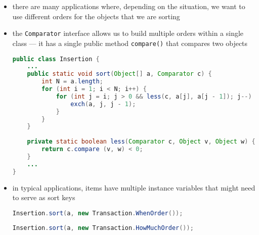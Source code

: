 \documentclass[8pt,a4paper,compress]{beamer}
\begin{document}
\begin{frame}[fragile]
\begin{itemize}
\item there are many applications where, depending on the situation, we want to use different orders for the objects that we are sorting

\item the \lstinline$Comparator$ interface allows us to build multiple orders within a single class --- it has
a single public method \lstinline$compare()$ that compares two objects
\begin{lstlisting}[language=Java]
public class Insertion {
    ...
    public static void sort(Object[] a, Comparator c) {
        int N = a.length;
        for (int i = 1; i < N; i++) {
            for (int j = i; j > 0 && less(c, a[j], a[j - 1]); j--) {
                exch(a, j, j - 1);
            }
        }
    }
    
    private static boolean less(Comparator c, Object v, Object w) {     
        return c.compare (v, w) < 0; 
    }
    ...
}
\end{lstlisting}

\item in typical applications, items have multiple instance variables that might need to serve as sort keys
\begin{lstlisting}[language=Java]
Insertion.sort(a, new Transaction.WhenOrder());
\end{lstlisting}

\begin{lstlisting}[language=Java]
Insertion.sort(a, new Transaction.HowMuchOrder());
\end{lstlisting}
\end{itemize}
\end{frame}
\end{document}
